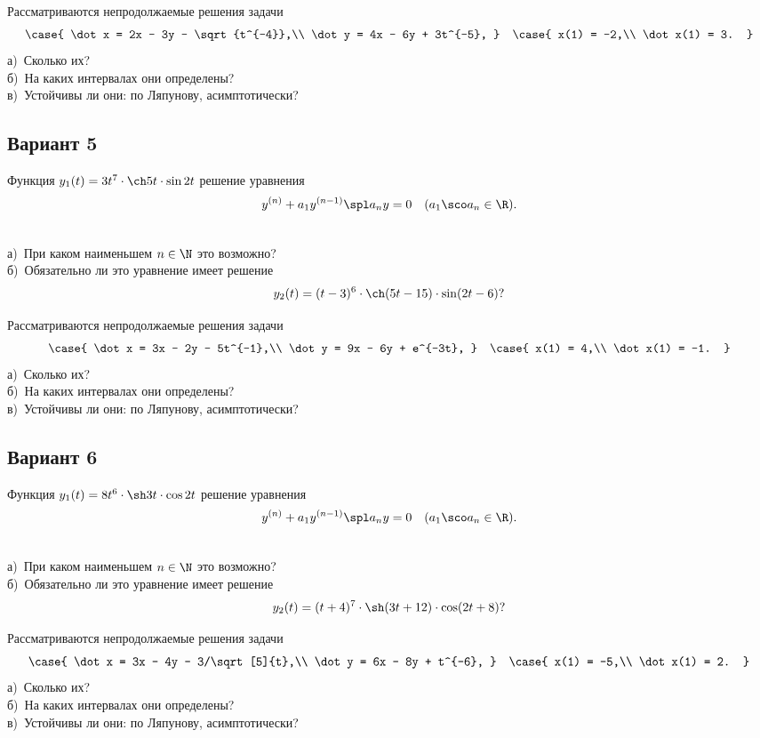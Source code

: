 \documentclass{article}
\begin{document}
\begin{problem}[2+1+3 балла]
Рассматриваются непродолжаемые решения задачи
$$
\case{
\dot x = 2x - 3y - \sqrt{t^{-4}},\\
\dot y = 4x - 6y + 3t^{-5},
}
\quad
\case{
x(1) = -2,\\
\dot x(1) = 3.
}
$$
а)~Сколько их?\\
б)~На каких интервалах они определены?\\
в)~Устойчивы ли они: по Ляпунову, асимптотически?
\end{problem}

\subsection{Вариант 5}

Функция $y_1(t) = 3t^7 \cdot \ch 5t \cdot \sin 2t$ решение уравнения
$$y^{(n)} + a_1y^{(n-1)}\spl a_ny = 0\quad (a_1\sco a_n \in \R).$$
\begin{problem}[2+2 балла]\\
а)~При каком наименьшем $n \in \N$ это возможно?\\
б)~Обязательно ли это уравнение имеет решение
$$y_2(t) = (t-3)^6\cdot \ch(5t-15)\cdot \sin(2t-6)?$$
\end{problem}

\begin{problem}[2+1+3 балла]
Рассматриваются непродолжаемые решения задачи
$$
\case{
\dot x = 3x - 2y - 5t^{-1},\\
\dot y = 9x - 6y + e^{-3t},
}
\quad
\case{
x(1) = 4,\\
\dot x(1) = -1.
}
$$
а)~Сколько их?\\
б)~На каких интервалах они определены?\\
в)~Устойчивы ли они: по Ляпунову, асимптотически?
\end{problem}

\subsection{Вариант 6}

Функция $y_1(t) = 8t^6 \cdot \sh 3t \cdot \cos 2t$ решение уравнения
$$y^{(n)} + a_1y^{(n-1)}\spl a_ny = 0\quad (a_1\sco a_n \in \R).$$
\begin{problem}[2+2 балла]\\
а)~При каком наименьшем $n \in \N$ это возможно?\\
б)~Обязательно ли это уравнение имеет решение
$$y_2(t) = (t+4)^7\cdot \sh(3t+12)\cdot \cos(2t+8)?$$
\end{problem}

\begin{problem}[2+1+3 балла]
Рассматриваются непродолжаемые решения задачи
$$
\case{
\dot x = 3x - 4y - 3/\sqrt[5]{t},\\
\dot y = 6x - 8y + t^{-6},
}
\quad
\case{
x(1) = -5,\\
\dot x(1) = 2.
}
$$
а)~Сколько их?\\
б)~На каких интервалах они определены?\\
в)~Устойчивы ли они: по Ляпунову, асимптотически?
\end{problem}


\medskip\dmvntrail
\end{document}
